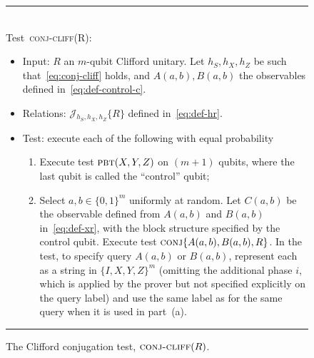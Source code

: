 \documentclass[11pt]{article}
\numberwithin{equation}{section}
\theoremstyle{definition}
\theoremstyle{plain}
\newcommand{\pbt}{\textsc{pbt}}
\newcommand{\conj}{\textsc{conj}}
\newcommand{\conjc}{\textsc{conj-cliff}}
\newcommand{\conjr}{\mathcal{J}\!}
\begin{document}
\begin{figure}[H]
\rule[1ex]{\textwidth}{0.5pt}\\
Test~\conjc(R): 
\begin{itemize}
    \item Input: $R$ an $m$-qubit Clifford unitary. 	Let $h_S,h_X,h_Z$ be such that~\eqref{eq:conj-cliff} holds, and $A(a,b),B(a,b)$ the observables defined in~\eqref{eq:def-control-c}. 
    \item Relations: $\conjr_{h_S,h_X,h_Z}\{R\}$ defined in~\eqref{eq:def-hr}. 
    \item Test: execute each of the following with equal probability
\begin{enumerate}
\item[(a)] Execute test $\pbt(X,Y,Z)$ on $(m+1)$ qubits, where the last qubit is called the ``control'' qubit;
\item[(b)] Select $a,b\in\{0,1\}^m$ uniformly at random. Let $C(a,b)$ be the observable defined from $A(a,b)$ and $B(a,b)$ in~\eqref{eq:def-xr}, with the block structure specified by the control qubit. Execute test $\conj\{A(a,b),B(a,b),R\}$. In the test, to specify query $A(a,b)$ or $B(a,b)$, represent each as a string in $\{I,X,Y,Z\}^m$ (omitting the additional phase $i$, which is applied by the prover but not specified explicitly on the query label) and use the same label as for the same query when it is used in part~(a).
\end{enumerate}
\end{itemize}
\rule[2ex]{\textwidth}{0.5pt}\vspace{-0.5cm}
\caption{The Clifford conjugation test, $\conjc(R)$.}
\label{fig:conjugation-test-2}
\end{figure}
\end{document}
